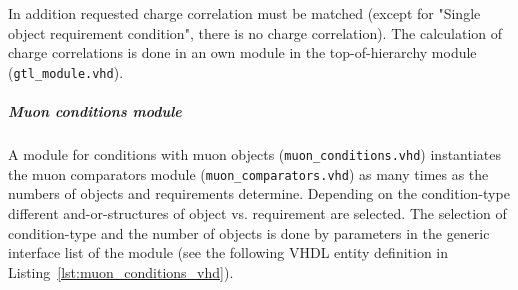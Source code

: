 In addition requested charge correlation must be matched (except for "Single object requirement condition", there is no charge correlation).
The calculation of charge correlations is done in an own module in the top-of-hierarchy module (\texttt{gtl\_module.vhd}).\\

\subparagraph{Muon conditions module}
A module for conditions with muon objects (\texttt{muon\_conditions.vhd}) instantiates the muon comparators module (\texttt{muon\_comparators.vhd}) as many times as
the numbers of objects and requirements determine. Depending on the condition-type different and-or-structures of object vs. requirement are selected.
The selection of condition-type and the number of objects is done by parameters in the generic interface list of the module
(see the following VHDL entity definition in Listing~\ref{lst:muon_conditions_vhd}).\\

\clearpage


\clearpage

